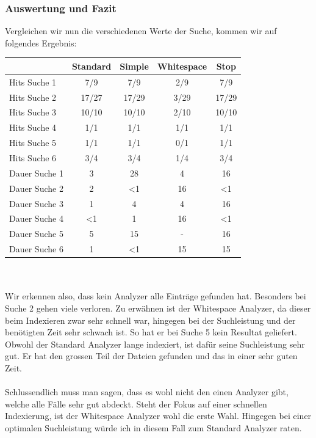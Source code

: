 \documentclass[12pt,a4paper,ngerman]{report}
\begin{document}
\subsubsection*{Auswertung und Fazit}
Vergleichen wir nun die verschiedenen Werte der Suche, kommen wir auf folgendes Ergebnis: \\
\begin{tabular}{|l|c|c|c|c|} \hline
 & \textbf{Standard} & \textbf{Simple} & \textbf{Whitespace} & \textbf{Stop} \\ \hline
Hits Suche 1 & 7/9 & 7/9 & 2/9 & 7/9\\
Hits Suche 2 & 17/27 & 17/29 & 3/29 & 17/29\\
Hits Suche 3 & 10/10 & 10/10 & 2/10 & 10/10\\
Hits Suche 4 & 1/1 & 1/1 & 1/1 & 1/1\\
Hits Suche 5 & 1/1 & 1/1 & 0/1 & 1/1\\
Hits Suche 6 & 3/4 & 3/4& 1/4 & 3/4\\ \hline
Dauer Suche 1 & 3 & 28 & 4 & 16\\
Dauer Suche 2 & 2 & \textless 1 & 16 & \textless 1\\
Dauer Suche 3 & 1 & 4 & 4 & 16\\
Dauer Suche 4 & \textless 1 & 1 & 16 & \textless 1\\
Dauer Suche 5 & 5 & 15 & - & 16\\
Dauer Suche 6 & 1 & \textless 1 & 15 & 15\\ \hline
\end{tabular} \\ \\
Wir erkennen also, dass kein Analyzer alle Einträge gefunden hat. Besonders bei Suche 2 gehen viele verloren. Zu erwähnen ist der Whitespace Analyzer, da dieser beim Indexieren zwar sehr schnell war, hingegen bei der Suchleistung und der benötigten Zeit sehr schwach ist. So hat er bei Suche 5 kein Resultat geliefert. Obwohl der Standard Analyzer lange indexiert, ist dafür seine Suchleistung sehr gut. Er hat den grossen Teil der Dateien gefunden und das in einer sehr guten Zeit.\\
\\
Schlussendlich muss man sagen, dass es wohl nicht den einen Analyzer gibt, welche alle Fälle sehr gut abdeckt. Steht der Fokus auf einer schnellen Indexierung, ist der Whitespace Analyzer wohl die erste Wahl. Hingegen bei einer optimalen Suchleistung würde ich in diesem Fall zum Standard Analyzer raten.
\end{document}
